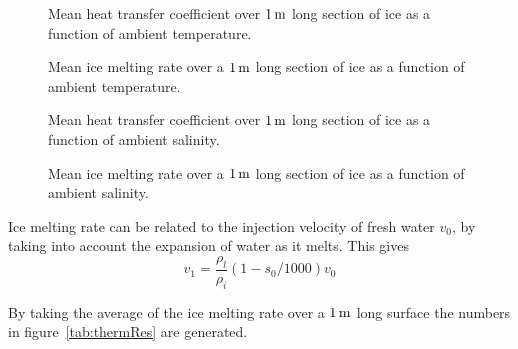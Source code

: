 	\begin{figure}[h]
		\begin{center}
			\setlength\figureheight{6cm} 
			\setlength\figurewidth{9cm} 
			
		\end{center}
		\caption{Mean heat transfer coefficient over $\unit[1]{m}$ long section of ice as a function of ambient temperature.}
		\label{fig:h_Tinf}
	\end{figure}
	
	\begin{figure}[h]
		\begin{center}
			\setlength\figureheight{6cm} 
			\setlength\figurewidth{9cm} 
			
		\end{center}
		\caption{Mean ice melting rate over a $\unit[1]{m}$ long section of ice as a function of ambient temperature.}
		\label{fig:Mdot_Tinf}
	\end{figure}

	\begin{figure}[h]
		\begin{center}
			\setlength\figureheight{6cm} 
			\setlength\figurewidth{9cm} 
			
		\end{center}
		\caption{Mean heat transfer coefficient over $\unit[1]{m}$ long section of ice as a function of ambient salinity.}
		\label{fig:h_sinf}
	\end{figure}

	\begin{figure}[h]
		\begin{center}
			\setlength\figureheight{6cm} 
			\setlength\figurewidth{9cm} 
			
		\end{center}
		\caption{Mean ice melting rate over a $\unit[1]{m}$ long section of ice as a function of ambient salinity.}
		\label{fig:Mdot_sinf}
	\end{figure}


	Ice melting rate can be related to the injection velocity of fresh water $v_0$, by taking into account the expansion of water as it melts. This gives
	\begin{equation*}
	  v_1 = \frac{\rho_l}{\rho_i}(1-s_0/1000)v_0
	\end{equation*}

	By taking the average of the ice melting rate over a $\unit[1]{m}$ long surface the numbers in figure~\ref{tab:thermRes} are generated.

